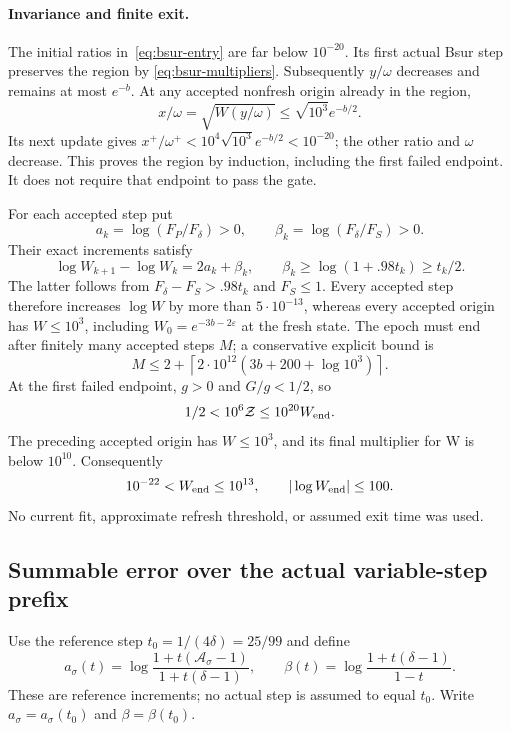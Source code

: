 \paragraph{Invariance and finite exit.}
The initial ratios in~\eqref{eq:bsur-entry} are far below $10^{-20}$.
Its first actual Bsur step preserves the region by
\eqref{eq:bsur-multipliers}. Subsequently $y/\omega$ decreases and remains at
most $e^{-b}$. At any accepted nonfresh origin already in the region,
\[
 x/\omega=\sqrt{W(y/\omega)}\le\sqrt{10^3}e^{-b/2}.
\]
Its next update gives $x^+/\omega^+<10^4\sqrt{10^3}e^{-b/2}<10^{-20}$;
the other ratio and $\omega$ decrease. This proves the region by induction,
including the first failed endpoint. It does not require that endpoint to pass
the gate.

For each accepted step put
\[
 a_k=\log(F_P/F_\delta)>0,\qquad
 \beta_k=\log(F_\delta/F_S)>0.
\]
Their exact increments satisfy
\begin{equation}\label{eq:bsur-log-motion}
 \log W_{k+1}-\log W_k=2a_k+\beta_k,
 \qquad \beta_k\ge\log(1+.98t_k)\ge t_k/2.
\end{equation}
The latter follows from $F_\delta-F_S>.98t_k$ and $F_S\le1$.
Every accepted step therefore increases $\log W$ by more than
$5\cdot10^{-13}$, whereas every accepted origin has $W\le10^3$, including
$W_0=e^{-3b-2\varepsilon}$ at the fresh state. The epoch must end after finitely
many accepted steps $M$; a conservative explicit bound is
\[
 M\le2+\left\lceil2\cdot10^{12}
                  (3b+200+\log10^3)\right\rceil.
\]
At the first failed endpoint, $g>0$ and $G/g<1/2$, so
\[
 1/2<10^6\mathcal Z\le10^{20}W_{\rm end}.
\]
The preceding accepted origin has $W\le10^3$, and its final multiplier for W
is below $10^{10}$. Consequently
\begin{equation}\label{eq:bsur-endpoint}
 10^{-22}<W_{\rm end}\le10^{13},\qquad
 |\log W_{\rm end}|\le100.
\end{equation}
No current fit, approximate refresh threshold, or assumed exit time was used.

\subsection{Summable error over the actual variable-step prefix}
\label{sec:bsur-prefix}

Use the reference step $t_0=1/(4\delta)=25/99$ and define
\[
 a_\sigma(t)=\log\frac{1+t(\mathcal A_\sigma-1)}{1+t(\delta-1)},
 \qquad
 \beta(t)=\log\frac{1+t(\delta-1)}{1-t}.
\]
These are reference increments; no actual step is assumed to equal $t_0$.
Write $a_\sigma=a_\sigma(t_0)$ and $\beta=\beta(t_0)$.

